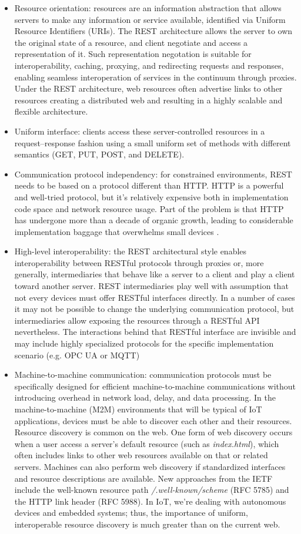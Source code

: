 \documentclass{ieeeaccess}
\begin{document}
\begin{itemize}
    \item Resource orientation: resources are an information abstraction that allows servers to make any information or service available, identified via Uniform Resource Identifiers (URIs). The REST architecture allows the server to own the original state of a resource, and client negotiate and access a representation of it. Such representation negotation is suitable for interoperability, caching, proxying, and redirecting requests and responses, enabling seamless interoperation of services in the continuum through proxies. Under the REST architecture, web resources often advertise links to other resources creating a distributed web and resulting in a highly scalable and flexible architecture. 
    \item Uniform interface: clients access these server-controlled resources in a request–response fashion using a small uniform set of methods with different semantics (GET, PUT, POST, and DELETE).
    \item Communication protocol independency: for constrained environments, REST needs to be based on a protocol different than HTTP. HTTP is a powerful and well-tried protocol, but it's relatively expensive both in implementation code space and network resource usage. Part of the problem is that HTTP has undergone more than a decade of organic growth, leading to considerable implementation baggage that overwhelms small devices \cite{coap}.
    \item High-level interoperability: the REST architectural style enables interoperability between RESTful protocols through proxies or, more generally, intermediaries that behave like a server to a client and play a client toward another server. REST intermediaries play well with assumption that not every devices must offer RESTful interfaces directly. In a number of cases it may not be possible to change the underlying communication protocol, but intermediaries allow exposing the resources through a RESTful API nevertheless. The interactions behind that RESTful interface are invisible and may include highly specialized protocols for the specific implementation scenario (e.g. OPC UA or MQTT) \cite{web-of-things}
    \item Machine-to-machine communication: communication protocols must be specifically designed for efficient machine-to-machine communications without introducing overhead in network load, delay, and data processing. In the machine-to-machine (M2M) environments that will be typical of IoT applications, devices must be able to discover each other and their resources. Resource discovery is common on the web. One form of web discovery occurs when a user access a server's default resource (such as \emph{index.html}), which often includes links to other web resources available on that or related servers. Machines can also perform web discovery if standardized interfaces and resource descriptions are available. New approaches from the IETF include the well-known resource path \emph{/.well-known/scheme} (RFC 5785) and the HTTP link header (RFC 5988). In IoT, we're dealing with autonomous devices and embedded systems; thus, the importance of uniform, interoperable resource discovery is much greater than on the current web.

\end{itemize}
\end{document}

